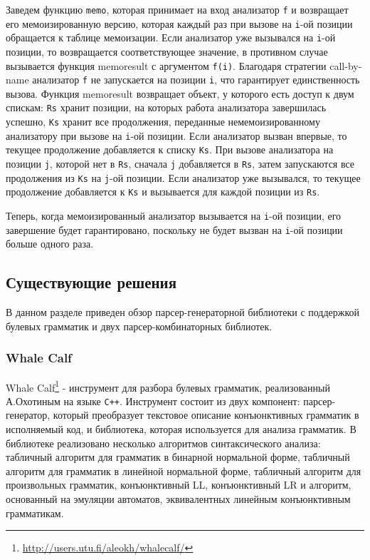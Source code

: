 \documentclass[14pt]{matmex-diploma}
\begin{document}
Заведем функцию {\tt memo}, которая принимает на вход анализатор {\tt f} и возвращает его мемоизированную версию, которая каждый раз при вызове на {\tt i}-ой позиции обращается к таблице мемоизации. Если анализатор уже вызывался на {\tt i}-ой позиции, то возвращается соответствующее значение, в противном случае вызывается функция memoresult с аргументом {\tt f(i)}. Благодаря стратегии call-by-name анализатор {\tt f} не запускается на позиции {\tt i}, что гарантирует единственность вызова. Функция memoresult возвращает объект, у которого есть доступ к двум спискам: {\tt Rs} хранит позиции, на которых работа анализатора завершилась успешно, {\tt Ks} хранит все продолжения, переданные немемоизированному анализатору при вызове на {\tt i}-ой позиции. Если анализатор вызван впервые, то текущее продолжение добавляется к списку {\tt Ks}. При вызове анализатора на позиции {\tt j}, которой нет в {\tt Rs}, сначала {\tt j} добавляется  в {\tt Rs}, затем запускаются все продолжения из {\tt Ks} на {\tt j}-ой позиции. Если анализатор уже вызывался, то текущее продолжение добавляется к {\tt Ks} и вызывается для каждой позиции из {\tt Rs}.

Теперь, когда мемоизированный анализатор вызывается на {\tt i}-ой позиции, его завершение будет гарантировано, поскольку не будет вызван на {\tt i}-ой позиции больше одного раза.
    
\subsection{Существующие решения}
В данном разделе приведен обзор парсер-генераторной библиотеки с поддержкой булевых грамматик и двух парсер-комбинаторных библиотек.
\subsubsection{Whale Calf}

Whale Calf\footnote{\url{http://users.utu.fi/aleokh/whalecalf/}} - инструмент для разбора булевых грамматик, реализованный А.Охотиным на языке {\tt C++}. Инструмент состоит из двух компонент: парсер-генератор, который преобразует текстовое описание конъюнктивных грамматик в исполняемый код, и библиотека, которая используется для анализа грамматик. В библиотеке реализовано несколько алгоритмов синтаксического анализа: табличный алгоритм для грамматик в бинарной нормальной форме, табличный алгоритм для грамматик в линейной нормальной форме, табличный алгоритм для произвольных грамматик, конъюнктивный LL, конъюнктивный LR и алгоритм, основанный на эмуляции автоматов, эквивалентных линейным конъюнктивным грамматикам. 
\end{document}
